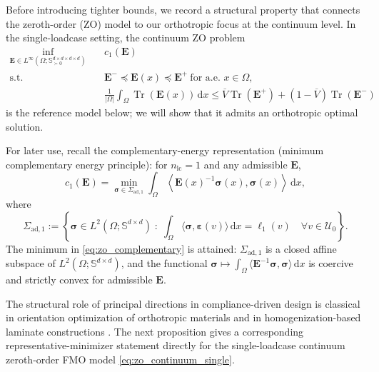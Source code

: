 \documentclass[preprint,3p]{elsarticle}
\newcommand{\tens}[1]{\bm{\mathit{#1}}}             %
\newcommand{\tenss}[1]{\bm{\mathbf{#1}}}            %
\newcommand{\tensf}[1]{\bm{\mathbf{#1}}}            %
\newcommand{\strain}{\tenss{\varepsilon}}           %
\newcommand{\stress}{\tenss{\sigma}}                %
\newcommand{\Emin}{\tensf{E}^{-}}                   %
\newcommand{\Emax}{\tensf{E}^{+}}                   %
\newcommand{\nlc}{n_\mathrm{lc}}                    %
\newcommand{\Tr}{\operatorname{Tr}}
\begin{document}
Before introducing tighter bounds, we record a structural property that connects the zeroth-order (ZO) model to our orthotropic focus at the continuum level. In the single-loadcase setting, the continuum ZO problem
%
\begin{subequations}\label{eq:zo_continuum_single}
\begin{align}
\inf_{\tensf E\in L^\infty(\Omega;\mathbb{S}^{d\times d\times d\times d}_{\succ0})}\quad
& c_1(\tensf E)\\
\text{s.t.}\quad
& \Emin \preceq \tensf E(\tens x)\preceq \Emax \ \text{for a.e. }\tens x\in\Omega,\\
&
\frac{1}{|\Omega|}\int_\Omega \Tr(\tensf E(\tens x))\,\mathrm d\tens x
\le \overline V\Tr(\Emax)+(1-\overline V)\Tr(\Emin)
\end{align}
\end{subequations}
%
is the reference model below; we will show that it admits an orthotropic optimal solution.

For later use, recall the complementary-energy representation (minimum complementary energy principle): for $\nlc=1$ and any admissible $\tensf E$,
%
\begin{equation}\label{eq:zo_complementary}
c_1(\tensf E)
=
\min_{\stress\in\Sigma_{\mathrm{ad},1}}
\int_\Omega \left\langle \tensf E(\tens x)^{-1}\stress(\tens x),\stress(\tens x)\right\rangle\,\mathrm d\tens x,
\end{equation}
%
where
%
\begin{equation}\label{eq:zo_sigma_ad}
\Sigma_{\mathrm{ad},1}
:=
\left\{
\stress\in L^2(\Omega;\mathbb S^{d\times d})\;:\;
\int_\Omega \langle \stress,\strain(\tens v)\rangle\,\mathrm d\tens x=\ell_1(\tens v)\quad \forall \tens v\in\mathcal U_0
\right\}.
\end{equation}
%
The minimum in \eqref{eq:zo_complementary} is attained: $\Sigma_{\mathrm{ad},1}$ is a closed affine subspace of
$L^2(\Omega;\mathbb S^{d\times d})$, and the functional
$\stress\mapsto\int_\Omega \langle \tensf E^{-1}\stress,\stress\rangle\,\mathrm d\tens x$
is coercive and strictly convex for admissible $\tensf E$.

The structural role of principal directions in compliance-driven design is classical in orientation optimization of orthotropic materials \citep{Pedersen1989} and in homogenization-based laminate constructions \citep{Allaire1993,Allaire2002}. The next proposition gives a corresponding representative-minimizer statement directly for the single-loadcase continuum zeroth-order FMO model \eqref{eq:zo_continuum_single}.
\end{document}
